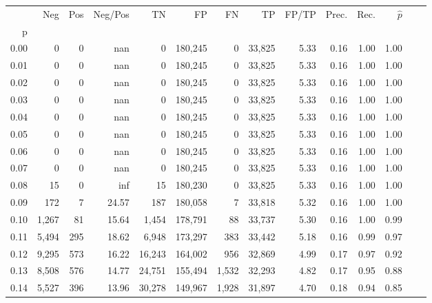 \begin{tabular}{rrrrrrrrrrrrrr}
\toprule
{} &    Neg &    Pos & Neg/Pos &       TN &       FP &      FN &      TP & FP/TP & Prec. &  Rec. & $\hat{p}$ \\
p    &        &        &         &          &          &         &         &       &       &       &           \\
\midrule
0.00 &      0 &      0 &     nan &        0 &  180,245 &       0 &  33,825 &  5.33 &  0.16 &  1.00 &      1.00 \\
0.01 &      0 &      0 &     nan &        0 &  180,245 &       0 &  33,825 &  5.33 &  0.16 &  1.00 &      1.00 \\
0.02 &      0 &      0 &     nan &        0 &  180,245 &       0 &  33,825 &  5.33 &  0.16 &  1.00 &      1.00 \\
0.03 &      0 &      0 &     nan &        0 &  180,245 &       0 &  33,825 &  5.33 &  0.16 &  1.00 &      1.00 \\
0.04 &      0 &      0 &     nan &        0 &  180,245 &       0 &  33,825 &  5.33 &  0.16 &  1.00 &      1.00 \\
0.05 &      0 &      0 &     nan &        0 &  180,245 &       0 &  33,825 &  5.33 &  0.16 &  1.00 &      1.00 \\
0.06 &      0 &      0 &     nan &        0 &  180,245 &       0 &  33,825 &  5.33 &  0.16 &  1.00 &      1.00 \\
0.07 &      0 &      0 &     nan &        0 &  180,245 &       0 &  33,825 &  5.33 &  0.16 &  1.00 &      1.00 \\
0.08 &     15 &      0 &     inf &       15 &  180,230 &       0 &  33,825 &  5.33 &  0.16 &  1.00 &      1.00 \\
0.09 &    172 &      7 &   24.57 &      187 &  180,058 &       7 &  33,818 &  5.32 &  0.16 &  1.00 &      1.00 \\
0.10 &  1,267 &     81 &   15.64 &    1,454 &  178,791 &      88 &  33,737 &  5.30 &  0.16 &  1.00 &      0.99 \\
0.11 &  5,494 &    295 &   18.62 &    6,948 &  173,297 &     383 &  33,442 &  5.18 &  0.16 &  0.99 &      0.97 \\
0.12 &  9,295 &    573 &   16.22 &   16,243 &  164,002 &     956 &  32,869 &  4.99 &  0.17 &  0.97 &      0.92 \\
0.13 &  8,508 &    576 &   14.77 &   24,751 &  155,494 &   1,532 &  32,293 &  4.82 &  0.17 &  0.95 &      0.88 \\
0.14 &  5,527 &    396 &   13.96 &   30,278 &  149,967 &   1,928 &  31,897 &  4.70 &  0.18 &  0.94 &      0.85 \\

\end{tabular}
